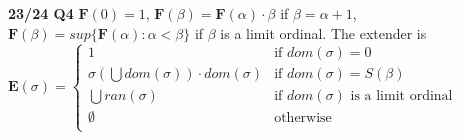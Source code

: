 \documentclass[10pt, landscape]{article}
\begin{document}
\begin{multicols*}{3}


\textbf{23/24 Q4} $\mathbf{F}(0)=1$, $\mathbf{F}(\beta)=\mathbf{F}(\alpha)\cdot\beta$ if $\beta=\alpha+1$, $\mathbf{F}(\beta)=sup\{\mathbf{F}(\alpha):\alpha<\beta\}$ if $\beta$ is a limit ordinal. The extender is $\mathbf{E}(\sigma) =
    \left\{
    \begin{array}{lr}
      1 & \text{if $dom(\sigma)=0$} \\
      \sigma(\bigcup dom(\sigma))\cdot dom(\sigma) & \text{if $dom(\sigma) =S(\beta)$} \\
      \bigcup ran(\sigma) & \text{if $dom(\sigma)$ is a limit ordinal} \\
      \emptyset & \text{otherwise}\\
    \end{array}
    \right.
    $


\end{multicols*}
\end{document}
